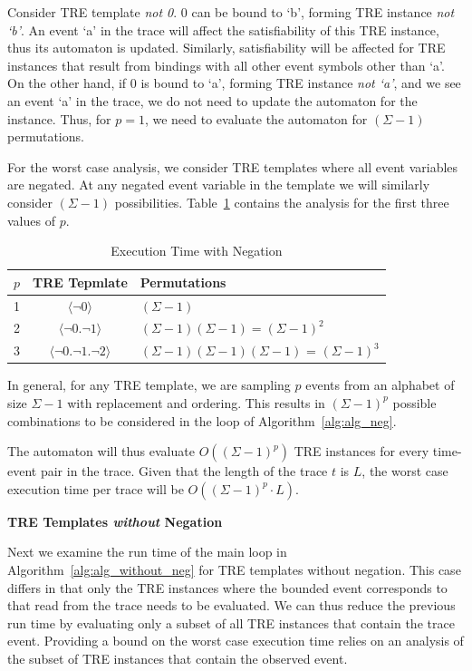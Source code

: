 \documentclass[]{sigplanconf}
\begin{document}
Consider TRE template \emph{not 0}.
0 can be bound to `b', forming TRE instance \emph{not `b'}. An event `a' in the trace will affect the satisfiability of this TRE instance, thus its automaton is updated. Similarly, satisfiability will be affected for TRE instances that result from bindings with all other event symbols other than `a'.
On the other hand, if 0 is bound to `a', forming TRE instance \emph{not `a'}, and we see an event `a' in the trace, we do not need to update the automaton for the instance. Thus, for $p=1$, we need to evaluate the automaton for $(\Sigma - 1)$ permutations.

For the worst case analysis, we consider TRE templates where all event variables are negated. At any negated event variable in the template we will similarly consider $(\Sigma - 1)$ possibilities. Table~\ref{Exec-neg} contains the analysis for the first three values of $p$.

\begin{table}[ht]
  \centering
  \begin{tabular}{|c|c|l|}
    \hline
    \textbf{$p$} & \textbf{TRE Tepmlate} & \textbf{Permutations}\\
    \hline
      1 & $\langle \neg 0 \rangle$ & $(\Sigma - 1)$ \\
    \hline
      2 & $\langle \neg 0 . \neg 1 \rangle$ & $(\Sigma - 1)(\Sigma - 1) = (\Sigma - 1)^2$ \\
    \hline
      3 & $\langle \neg 0 . \neg 1 . \neg 2 \rangle$ & $(\Sigma - 1)(\Sigma - 1)(\Sigma - 1)$ = $(\Sigma - 1)^3$\\
    \hline
  \end{tabular}
\caption{Execution Time with Negation} \label{Exec-neg}
\end{table}

In general, for any TRE template, we are sampling $p$ events from an alphabet of size $\Sigma - 1$ with replacement and ordering. This results in $(\Sigma - 1)^p$ possible combinations to be considered in the loop of Algorithm~\ref{alg:alg_neg}.

The automaton will thus evaluate $O((\Sigma - 1)^p)$ TRE instances for every time-event pair in the trace. Given that the length of the trace $t$ is $L$, the worst case execution time per trace will be $O((\Sigma - 1)^p \cdot L)$.

\vspace{3mm}

\noindent \textbf{TRE Templates \emph{without} Negation}

Next we examine the run time of the main loop in Algorithm~\ref{alg:alg_without_neg} for TRE templates without negation. This case differs in that only the TRE instances where the bounded event corresponds to that read from the trace needs to be evaluated. We can thus reduce the previous run time by evaluating only a subset of all TRE instances that contain the trace event. Providing a bound on the worst case execution time relies on an analysis of the subset of TRE instances that contain the observed event.
\end{document}
